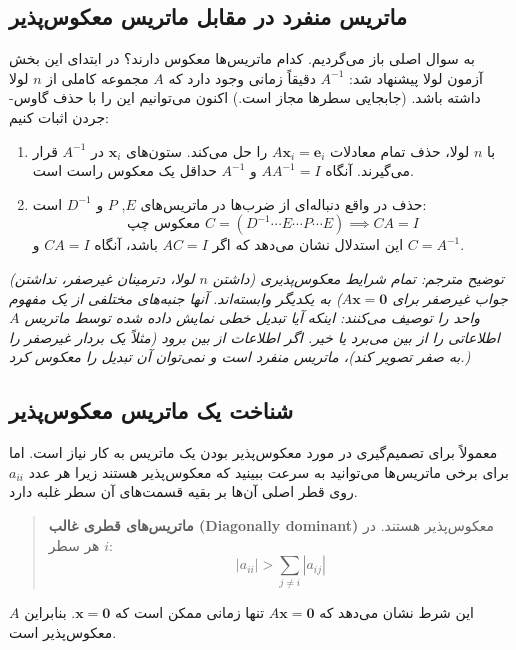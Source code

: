 \documentclass[12pt, a4paper]{book}
\begin{document}
	\subsection*{ماتریس منفرد در مقابل ماتریس معکوس‌پذیر}
	
	به سوال اصلی باز می‌گردیم. کدام ماتریس‌ها معکوس دارند؟ در ابتدای این بخش آزمون لولا پیشنهاد شد: $A^{-1}$ دقیقاً زمانی وجود دارد که $A$ مجموعه کاملی از $n$ لولا داشته باشد. (جابجایی سطرها مجاز است.) اکنون می‌توانیم این را با حذف گاوس-جردن اثبات کنیم:
	
	\begin{enumerate}
		\item با $n$ لولا، حذف تمام معادلات $A\mathbf{x}_i=\mathbf{e}_i$ را حل می‌کند. ستون‌های $\mathbf{x}_i$ در $A^{-1}$ قرار می‌گیرند. آنگاه $AA^{-1}=I$ و $A^{-1}$ حداقل یک معکوس راست است.
		\item حذف در واقع دنباله‌ای از ضرب‌ها در ماتریس‌های $E$, $P$ و $D^{-1}$ است:
		\[ \text{معکوس چپ } C = (D^{-1} \cdots E \cdots P \cdots E) \implies CA=I \]
		این استدلال نشان می‌دهد که اگر $AC=I$ باشد، آنگاه $CA=I$ و $C=A^{-1}$.
	\end{enumerate}
	
	\textit{(توضیح مترجم: تمام شرایط معکوس‌پذیری (داشتن $n$ لولا، دترمینان غیرصفر، نداشتن جواب غیرصفر برای $A\mathbf{x}=\mathbf{0}$) به یکدیگر وابسته‌اند. آنها جنبه‌های مختلفی از یک مفهوم واحد را توصیف می‌کنند: اینکه آیا تبدیل خطی نمایش داده شده توسط ماتریس $A$ اطلاعاتی را از بین می‌برد یا خیر. اگر اطلاعات از بین برود (مثلاً یک بردار غیرصفر را به صفر تصویر کند)، ماتریس منفرد است و نمی‌توان آن تبدیل را معکوس کرد.)}
	
	\subsection*{شناخت یک ماتریس معکوس‌پذیر}
	
	معمولاً برای تصمیم‌گیری در مورد معکوس‌پذیر بودن یک ماتریس به کار نیاز است. اما برای برخی ماتریس‌ها می‌توانید به سرعت ببینید که معکوس‌پذیر هستند زیرا هر عدد $a_{ii}$ روی قطر اصلی آن‌ها بر بقیه قسمت‌های آن سطر غلبه دارد.
	
	\begin{quote}
		\textbf{ماتریس‌های قطری غالب (Diagonally dominant)} معکوس‌پذیر هستند. در هر سطر $i$:
		\[ |a_{ii}| > \sum_{j \neq i} |a_{ij}| \]
	\end{quote}
	این شرط نشان می‌دهد که $A\mathbf{x}=\mathbf{0}$ تنها زمانی ممکن است که $\mathbf{x}=\mathbf{0}$. بنابراین $A$ معکوس‌پذیر است.
	
\end{document}
